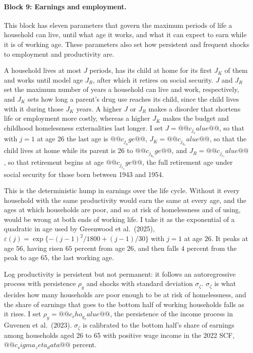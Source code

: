 \documentclass[10pt]{article}
\begin{document}
\paragraph{Block 9: Earnings and employment.}   This block has eleven parameters that govern the maximum periods of life a household can live, until what age it works, and what it can expect to earn while it is of working age. These parameters also set how persistent and frequent shocks to employment and productivity are.
\begin{description}\setlength{\itemsep}{0.25em}\setlength{\parskip}{0em}
\item[$J$, $J_K$ and $J_R$, the length of life, of child rearing and of working life, respectively.] A household lives at most
$J$ periods, has its child at home for its first $J_K$ of them and works until model age $J_R$, after which it retires on social security.
  $J$ and $J_R$ set the maximum number of years a household can live and work, respectively, and $J_K$ sets how long a parent's drug use reaches its child, since the child lives with it during those $J_K$ years. A higher $J$ or $J_R$ makes a disorder that shortens life or employment more costly, whereas a higher $J_K$ makes the budget and childhood homelessness externalities last longer. I set $J=@@c_j_value@@$, so
that with $j=1$ at age 26 the last age is $@@c_j_age@@$, $J_K=@@c_j_k_value@@$, so that the child lives at home while its parent is 26 to $@@c_j_k_age@@$, and $J_R=@@c_j_r_value@@$, so that retirement begins at age $@@c_j_r_age@@$, the
full retirement age under social security for those born between 1943 and 1954.
\item[$\varepsilon(j)$, the age profile of efficiency.] This is the deterministic hump in
earnings over the life cycle. Without it every
household with the same productivity would earn the same at every age, and the ages at which households are
poor, and so at risk of homelessness and of using, would be wrong at both ends of
working life. I take it as the exponential of a quadratic in age used by
Greenwood et al.\ (2025), $\varepsilon(j)=\exp\{-(j-1)^2/1800+(j-1)/30\}$ with $j=1$
at age $26$. It peaks at age $56$, having risen $65$ percent from age $26$, and then
falls $4$ percent from the peak to age $65$, the last working age.

\item[$\rho_y$ and $\sigma_\zeta$, the productivity process.] Log
productivity is persistent but not permanent: it follows an autoregressive process
with persistence $\rho_y$ and shocks with standard deviation
$\sigma_\zeta$. $\sigma_\zeta$ is what decides how many households are poor
enough to be at risk of homelessness, and the share of earnings
that goes to the bottom half of working households falls as it rises. I set
$\rho_y=@@c_rho_y_value@@$, the persistence of the income process in Guvenen et al.\ (2023). $\sigma_\zeta$
is calibrated to the bottom half's share of earnings among households aged 26 to 65 with
positive wage income in the 2022 SCF, $@@c_sigma_zeta_data@@$ percent.


\end{description}
\end{document}
